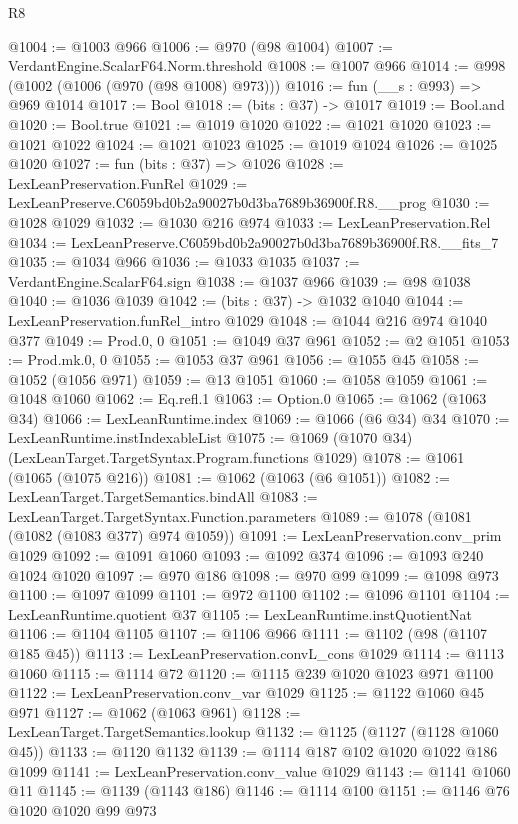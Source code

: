 \begin{lexlean}{R8}
\begin{coremodule}
@1004 := @1003 @966
@1006 := @970 (@98 @1004)
@1007 := VerdantEngine.ScalarF64.Norm.threshold
@1008 := @1007 @966
@1014 := @998 (@1002 (@1006 (@970 (@98 @1008) @973)))
@1016 := fun (__s : @993) => @969 @1014
@1017 := Bool
@1018 := (bits : @37) -> @1017
@1019 := Bool.and
@1020 := Bool.true
@1021 := @1019 @1020
@1022 := @1021 @1020
@1023 := @1021 @1022
@1024 := @1021 @1023
@1025 := @1019 @1024
@1026 := @1025 @1020
@1027 := fun (bits : @37) => @1026
@1028 := LexLeanPreservation.FunRel
@1029 := LexLeanPreserve.C6059bd0b2a90027b0d3ba7689b36900f.R8.__prog
@1030 := @1028 @1029
@1032 := @1030 @216 @974
@1033 := LexLeanPreservation.Rel
@1034 := LexLeanPreserve.C6059bd0b2a90027b0d3ba7689b36900f.R8.__fits_7
@1035 := @1034 @966
@1036 := @1033 @1035
@1037 := VerdantEngine.ScalarF64.sign
@1038 := @1037 @966
@1039 := @98 @1038
@1040 := @1036 @1039
@1042 := (bits : @37) -> @1032 @1040
@1044 := LexLeanPreservation.funRel_intro @1029
@1048 := @1044 @216 @974 @1040 @377
@1049 := Prod.{0, 0}
@1051 := @1049 @37 @961
@1052 := @2 @1051
@1053 := Prod.mk.{0, 0}
@1055 := @1053 @37 @961
@1056 := @1055 @45
@1058 := @1052 (@1056 @971)
@1059 := @13 @1051
@1060 := @1058 @1059
@1061 := @1048 @1060
@1062 := Eq.refl.{1}
@1063 := Option.{0}
@1065 := @1062 (@1063 @34)
@1066 := LexLeanRuntime.index
@1069 := @1066 (@6 @34) @34
@1070 := LexLeanRuntime.instIndexableList
@1075 := @1069 (@1070 @34) (LexLeanTarget.TargetSyntax.Program.functions @1029)
@1078 := @1061 (@1065 (@1075 @216))
@1081 := @1062 (@1063 (@6 @1051))
@1082 := LexLeanTarget.TargetSemantics.bindAll
@1083 := LexLeanTarget.TargetSyntax.Function.parameters
@1089 := @1078 (@1081 (@1082 (@1083 @377) @974 @1059))
@1091 := LexLeanPreservation.conv_prim @1029
@1092 := @1091 @1060
@1093 := @1092 @374
@1096 := @1093 @240 @1024 @1020
@1097 := @970 @186
@1098 := @970 @99
@1099 := @1098 @973
@1100 := @1097 @1099
@1101 := @972 @1100
@1102 := @1096 @1101
@1104 := LexLeanRuntime.quotient @37
@1105 := LexLeanRuntime.instQuotientNat
@1106 := @1104 @1105
@1107 := @1106 @966
@1111 := @1102 (@98 (@1107 @185 @45))
@1113 := LexLeanPreservation.convL_cons @1029
@1114 := @1113 @1060
@1115 := @1114 @72
@1120 := @1115 @239 @1020 @1023 @971 @1100
@1122 := LexLeanPreservation.conv_var @1029
@1125 := @1122 @1060 @45 @971
@1127 := @1062 (@1063 @961)
@1128 := LexLeanTarget.TargetSemantics.lookup
@1132 := @1125 (@1127 (@1128 @1060 @45))
@1133 := @1120 @1132
@1139 := @1114 @187 @102 @1020 @1022 @186 @1099
@1141 := LexLeanPreservation.conv_value @1029
@1143 := @1141 @1060 @11
@1145 := @1139 (@1143 @186)
@1146 := @1114 @100
@1151 := @1146 @76 @1020 @1020 @99 @973

\end{coremodule}
\end{lexlean}
